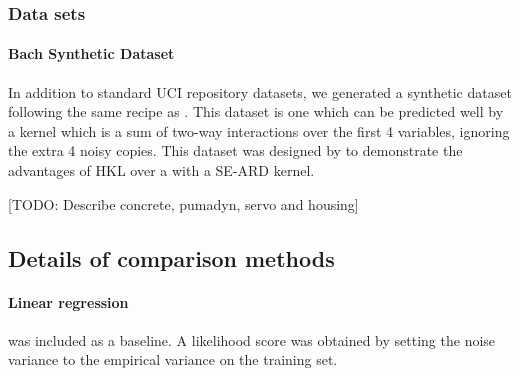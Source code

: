 \documentclass[twoside]{article}
\begin{document}

\subsubsection{Data sets}


\paragraph{Bach Synthetic Dataset}
In addition to standard UCI repository datasets, we generated a synthetic dataset following the same recipe as \cite{DBLP:journals/corr/abs-0909-0844}.
This dataset is one which can be predicted well by a kernel which is a sum of two-way interactions over the first 4 variables, ignoring the extra 4 noisy copies.
%
This dataset was designed by \cite{DBLP:journals/corr/abs-0909-0844} to demonstrate the advantages of HKL over a \gp{} with a SE-ARD kernel. 


[TODO: Describe concrete, pumadyn, servo and housing]

\subsection{Details of comparison methods}

\paragraph{Linear regression} was included as a baseline. A likelihood score was obtained by setting the noise variance to the empirical variance on the training set.
\end{document}
